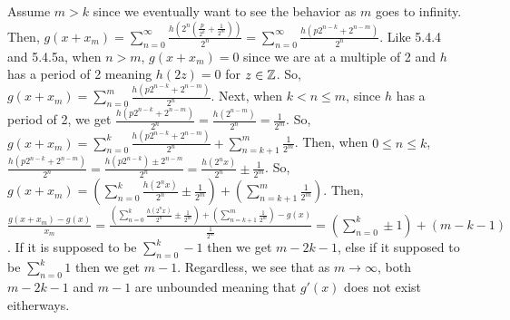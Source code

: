 \documentclass[12pt,letterpaper]{article}
\begin{document}
\begin{itemize}[leftmargin=!,labelindent=5pt]
\begin{itemize}
                    Assume $m > k$ since we eventually want to see the behavior as $m$ goes to infinity. 
                    Then, $g(x + x_m) = \sum_{n=0}^{\infty}\frac{h(2^n (\frac{p}{2^k} + \frac{1}{2^m}))}{2^n} = \sum_{n=0}^{\infty}\frac{h(p2^{n-k} + 2^{n-m})}{2^n}$.
                    Like 5.4.4 and 5.4.5a, when $n > m$, $g(x + x_m) = 0$ since we are at a multiple of 2 and $h$ has a period of 2 meaning $h(2z) = 0$ for $z\in\mathbb{Z}$.
                    So, $g(x + x_m) = \sum_{n=0}^{m}\frac{h(p2^{n-k} + 2^{n-m})}{2^n}$.
                    Next, when $k < n \leq m$, since $h$ has a period of 2, we get $\frac{h(p2^{n-k} + 2^{n-m})}{2^n} = \frac{h(2^{n-m})}{2^n} = \frac{1}{2^m}$.
                    So, $g(x + x_m) = \sum_{n=0}^{k}\frac{h(p2^{n-k} + 2^{n-m})}{2^n} + \sum_{n=k+1}^{m}\frac{1}{2^m}$.
                    Then, when $0 \leq n \leq k$, $\frac{h(p2^{n-k} + 2^{n-m})}{2^n} = \frac{h(p2^{n-k}) \pm 2^{n-m}}{2^n} = \frac{h(2^{n}x)}{2^n} \pm \frac{1}{2^m}$.
                    So, $g(x + x_m) = (\sum_{n=0}^{k}\frac{h(2^{n}x)}{2^n} \pm \frac{1}{2^m}) + (\sum_{n=k+1}^{m}\frac{1}{2^m})$.
                    Then, $\frac{g(x + x_m) - g(x)}{x_m} = \frac{(\sum_{n=0}^{k}\frac{h(2^{n}x)}{2^n} \pm \frac{1}{2^m}) + (\sum_{n=k+1}^{m}\frac{1}{2^m}) - g(x)}{\frac{1}{2^m}} = (\sum_{n=0}^k \pm 1) + (m-k-1)$.
                    If it is supposed to be $\sum_{n=0}^k -1$ then we get $m - 2k -1$, else if it supposed to be $\sum_{n=0}^k 1$ then we get $m-1$.
                    Regardless, we see that as $m \to \infty$, both $m - 2k -1$ and $m-1$ are unbounded meaning that $g'(x)$ does not exist eitherways.
            \end{itemize}
    \end{itemize}
\end{document}
